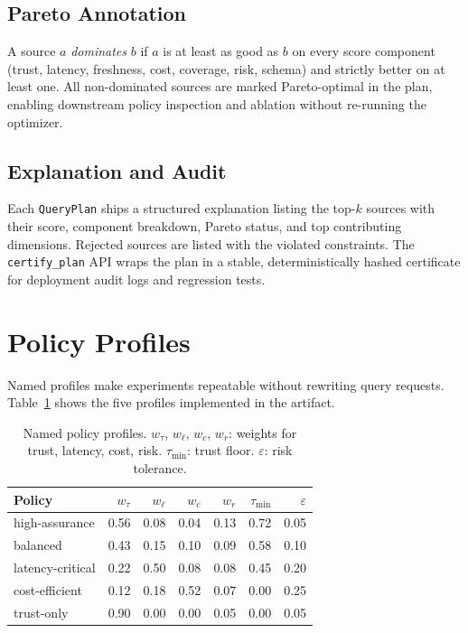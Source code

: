 \documentclass[runningheads]{llncs}
\begin{document}
\subsection{Pareto Annotation}

A source $a$ \emph{dominates} $b$ if $a$ is at least as good as $b$ on
every score component (trust, latency, freshness, cost, coverage, risk,
schema) and strictly better on at least one.  All non-dominated sources
are marked Pareto-optimal in the plan, enabling downstream policy
inspection and ablation without re-running the optimizer.

\subsection{Explanation and Audit}

Each \texttt{QueryPlan} ships a structured explanation listing the
top-$k$ sources with their score, component breakdown, Pareto status,
and top contributing dimensions.  Rejected sources are listed with the
violated constraints.  The \texttt{certify\_plan} API wraps the plan in
a stable, deterministically hashed certificate for deployment audit logs
and regression tests.

\section{Policy Profiles}
\label{sec:policies}

Named profiles make experiments repeatable without rewriting query
requests.  Table~\ref{tab:policies} shows the five profiles implemented
in the artifact.

\begin{table}[t]
\caption{Named policy profiles.  $w_\tau$, $w_\ell$, $w_c$, $w_r$:
  weights for trust, latency, cost, risk.
  $\tau_{\min}$: trust floor.  $\varepsilon$: risk tolerance.}
\label{tab:policies}
\centering
\begin{tabular}{lrrrrrr}
\toprule
Policy & $w_\tau$ & $w_\ell$ & $w_c$ & $w_r$ & $\tau_{\min}$ & $\varepsilon$\\
\midrule
high-assurance   & 0.56 & 0.08 & 0.04 & 0.13 & 0.72 & 0.05 \\
balanced         & 0.43 & 0.15 & 0.10 & 0.09 & 0.58 & 0.10 \\
latency-critical & 0.22 & 0.50 & 0.08 & 0.08 & 0.45 & 0.20 \\
cost-efficient   & 0.12 & 0.18 & 0.52 & 0.07 & 0.00 & 0.25 \\
trust-only       & 0.90 & 0.00 & 0.00 & 0.05 & 0.00 & 0.05 \\
\bottomrule
\end{tabular}
\end{table}
\end{document}
